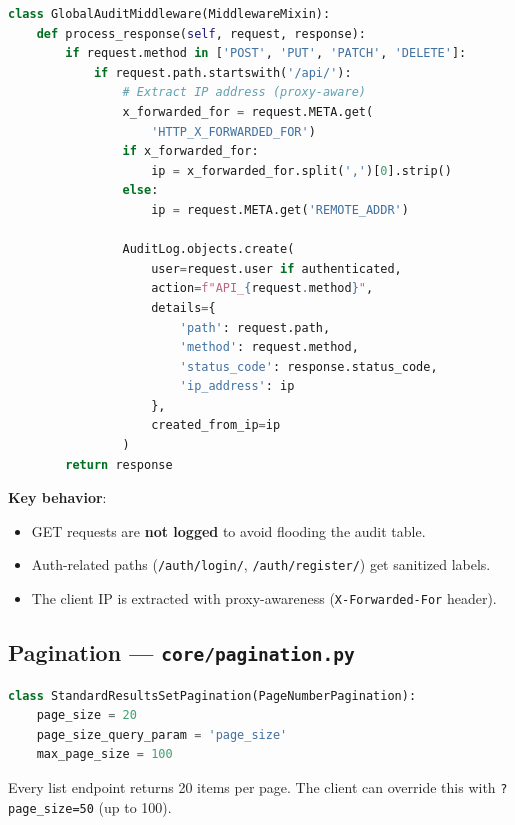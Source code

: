 \documentclass[12pt, a4paper]{article}
\begin{document}
\begin{lstlisting}[language=Python, caption={GlobalAuditMiddleware --- Automatic Request Logging}]
class GlobalAuditMiddleware(MiddlewareMixin):
    def process_response(self, request, response):
        if request.method in ['POST', 'PUT', 'PATCH', 'DELETE']:
            if request.path.startswith('/api/'):
                # Extract IP address (proxy-aware)
                x_forwarded_for = request.META.get(
                    'HTTP_X_FORWARDED_FOR')
                if x_forwarded_for:
                    ip = x_forwarded_for.split(',')[0].strip()
                else:
                    ip = request.META.get('REMOTE_ADDR')

                AuditLog.objects.create(
                    user=request.user if authenticated,
                    action=f"API_{request.method}",
                    details={
                        'path': request.path,
                        'method': request.method,
                        'status_code': response.status_code,
                        'ip_address': ip
                    },
                    created_from_ip=ip
                )
        return response
\end{lstlisting}

\textbf{Key behavior}:
\begin{itemize}
    \item GET requests are \textbf{not logged} to avoid flooding the audit table.
    \item Auth-related paths (\texttt{/auth/login/}, \texttt{/auth/register/}) get sanitized labels.
    \item The client IP is extracted with proxy-awareness (\texttt{X-Forwarded-For} header).
\end{itemize}

\subsection{Pagination --- \texttt{core/pagination.py}}

\begin{lstlisting}[language=Python, caption={Standard Pagination Configuration}]
class StandardResultsSetPagination(PageNumberPagination):
    page_size = 20
    page_size_query_param = 'page_size'
    max_page_size = 100
\end{lstlisting}

Every list endpoint returns 20 items per page. The client can override this with \texttt{?page\_size=50} (up to 100).
\end{document}
